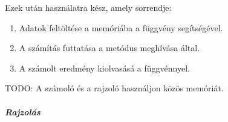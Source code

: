 Ezek ut\'an haszn\'alatra k\'esz, amely sorrendje:
\begin{enumerate}
	\item Adatok felt\"olt\'ese a mem\'ori\'aba a  f\"uggv\'eny seg\'its\'eg\'evel.
	\item A sz\'am\'it\'as futtat\'asa a  met\'odus megh\'iv\'asa \'altal.
	\item A sz\'amolt eredm\'eny kiolvas\'as\'a a  f\"uggv\'ennyel.
\end{enumerate}
TODO: A sz\'amol\'o \'es a rajzol\'o haszn\'aljon k\"oz\"os mem\'ori\'at.

\subparagraph{Rajzol\'as}
